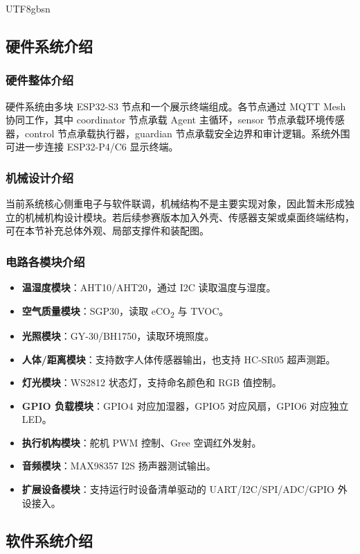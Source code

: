 \documentclass[a4paper,12pt]{article}
\begin{document}
\begin{CJK*}{UTF8}{gbsn}
\subsection{硬件系统介绍}

\subsubsection{硬件整体介绍}
硬件系统由多块 ESP32-S3 节点和一个展示终端组成。各节点通过 MQTT Mesh 协同工作，其中 coordinator 节点承载 Agent 主循环，sensor 节点承载环境传感器，control 节点承载执行器，guardian 节点承载安全边界和审计逻辑。系统外围可进一步连接 ESP32-P4/C6 显示终端。

\subsubsection{机械设计介绍}
当前系统核心侧重电子与软件联调，机械结构不是主要实现对象，因此暂未形成独立的机械机构设计模块。若后续参赛版本加入外壳、传感器支架或桌面终端结构，可在本节补充总体外观、局部支撑件和装配图。

\subsubsection{电路各模块介绍}
\begin{itemize}
  \item \textbf{温湿度模块}：AHT10/AHT20，通过 I2C 读取温度与湿度。
  \item \textbf{空气质量模块}：SGP30，读取 eCO\textsubscript{2} 与 TVOC。
  \item \textbf{光照模块}：GY-30/BH1750，读取环境照度。
  \item \textbf{人体/距离模块}：支持数字人体传感器输出，也支持 HC-SR05 超声测距。
  \item \textbf{灯光模块}：WS2812 状态灯，支持命名颜色和 RGB 值控制。
  \item \textbf{GPIO 负载模块}：GPIO4 对应加湿器，GPIO5 对应风扇，GPIO6 对应独立 LED。
  \item \textbf{执行机构模块}：舵机 PWM 控制、Gree 空调红外发射。
  \item \textbf{音频模块}：MAX98357 I2S 扬声器测试输出。
  \item \textbf{扩展设备模块}：支持运行时设备清单驱动的 UART/I2C/SPI/ADC/GPIO 外设接入。
\end{itemize}

\subsection{软件系统介绍}


\end{CJK*}
\end{document}

